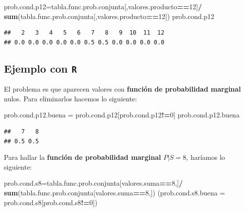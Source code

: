 \documentclass[]{book}
\newenvironment{Shaded}{\begin{snugshade}}{\end{snugshade}}
\newcommand{\DataTypeTok}[1]{\textcolor[rgb]{0.13,0.29,0.53}{#1}}
\newcommand{\DecValTok}[1]{\textcolor[rgb]{0.00,0.00,0.81}{#1}}
\newcommand{\KeywordTok}[1]{\textcolor[rgb]{0.13,0.29,0.53}{\textbf{#1}}}
\newcommand{\NormalTok}[1]{#1}
\newcommand{\OperatorTok}[1]{\textcolor[rgb]{0.81,0.36,0.00}{\textbf{#1}}}
\newcommand{\StringTok}[1]{\textcolor[rgb]{0.31,0.60,0.02}{#1}}
\begin{document}
\begin{Shaded}
\begin{Highlighting}[]
\NormalTok{prob.cond.p12=tabla.func.prob.conjunta[,valores.producto}\OperatorTok{==}\DecValTok{12}\NormalTok{]}\OperatorTok{/}
\StringTok{  }\KeywordTok{sum}\NormalTok{(tabla.func.prob.conjunta[,valores.producto}\OperatorTok{==}\DecValTok{12}\NormalTok{])}
\NormalTok{prob.cond.p12}
\end{Highlighting}
\end{Shaded}

\begin{verbatim}
##   2   3   4   5   6   7   8   9  10  11  12 
## 0.0 0.0 0.0 0.0 0.0 0.5 0.5 0.0 0.0 0.0 0.0
\end{verbatim}

\hypertarget{ejemplo-con-r-7}{%
\subsection{\texorpdfstring{Ejemplo con \texttt{R}}{Ejemplo con R}}\label{ejemplo-con-r-7}}

El problema es que aparecen valores con \textbf{función de probabilidad marginal} nulos. Para eliminarlos hacemos lo siguiente:

\begin{Shaded}
\begin{Highlighting}[]
\NormalTok{prob.cond.p12.buena =}\StringTok{ }\NormalTok{prob.cond.p12[prob.cond.p12}\OperatorTok{!=}\DecValTok{0}\NormalTok{]}
\NormalTok{prob.cond.p12.buena}
\end{Highlighting}
\end{Shaded}

\begin{verbatim}
##   7   8 
## 0.5 0.5
\end{verbatim}

Para hallar la \textbf{función de probabilidad marginal} \(P|S=8\), haríamos lo siguiente:

\begin{Shaded}
\begin{Highlighting}[]
\NormalTok{prob.cond.s8=tabla.func.prob.conjunta[valores.suma}\OperatorTok{==}\DecValTok{8}\NormalTok{,]}\OperatorTok{/}
\StringTok{  }\KeywordTok{sum}\NormalTok{(tabla.func.prob.conjunta[valores.suma}\OperatorTok{==}\DecValTok{8}\NormalTok{,])}
\NormalTok{(}\DataTypeTok{prob.cond.s8.buena =}\NormalTok{ prob.cond.s8[prob.cond.s8}\OperatorTok{!=}\DecValTok{0}\NormalTok{])}
\end{Highlighting}
\end{Shaded}
\end{document}

